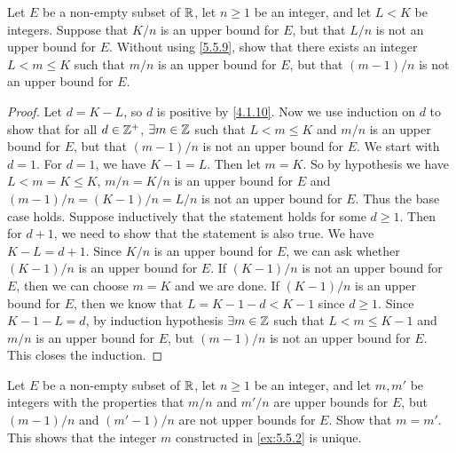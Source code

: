\begin{ex}\label{ex:5.5.2}
  Let \(E\) be a non-empty subset of \(\mathbb{R}\), let \(n \geq 1\) be an integer, and let \(L < K\) be integers.
  Suppose that \(K / n\) is an upper bound for \(E\), but that \(L / n\) is not an upper bound for \(E\).
  Without using \cref{5.5.9}, show that there exists an integer \(L < m \leq K\) such that \(m / n\) is an upper bound for \(E\), but that \((m - 1) / n\) is not an upper bound for \(E\).
\end{ex}

\begin{proof}
  Let \(d = K - L\), so \(d\) is positive by \cref{4.1.10}.
  Now we use induction on \(d\) to show that for all \(d \in \mathbb{Z}^+\), \(\exists m \in \mathbb{Z}\) such that \(L < m \leq K\) and \(m / n\) is an upper bound for \(E\), but that \((m - 1) / n\) is not an upper bound for \(E\).
  We start with \(d = 1\).
  For \(d = 1\), we have \(K - 1 = L\).
  Then let \(m = K\).
  So by hypothesis we have \(L < m = K \leq K\), \(m / n = K / n\) is an upper bound for \(E\) and \((m - 1) / n = (K - 1) / n = L / n\) is not an upper bound for \(E\).
  Thus the base case holds.
  Suppose inductively that the statement holds for some \(d \geq 1\).
  Then for \(d + 1\), we need to show that the statement is also true.
  We have \(K - L = d + 1\).
  Since \(K / n\) is an upper bound for \(E\), we can ask whether \((K - 1) / n\) is an upper bound for \(E\).
  If \((K - 1) / n\) is not an upper bound for \(E\), then we can choose \(m = K\) and we are done.
  If \((K - 1) / n\) is an upper bound for \(E\), then we know that \(L = K - 1 - d < K - 1\) since \(d \geq 1\).
  Since \(K - 1 - L = d\), by induction hypothesis \(\exists m \in \mathbb{Z}\) such that \(L < m \leq K - 1\) and \(m / n\) is an upper bound for \(E\), but \((m - 1) / n\) is not an upper bound for \(E\).
  This closes the induction.
\end{proof}

\begin{ex}\label{ex:5.5.3}
  Let \(E\) be a non-empty subset of \(\mathbb{R}\), let \(n \geq 1\) be an integer, and let \(m, m'\) be integers with the properties that \(m / n\) and \(m' / n\) are upper bounds for \(E\), but \((m - 1) / n\) and \((m' - 1) / n\) are not upper bounds for \(E\).
  Show that \(m = m'\).
  This shows that the integer \(m\) constructed in \cref{ex:5.5.2} is unique.
\end{ex}

